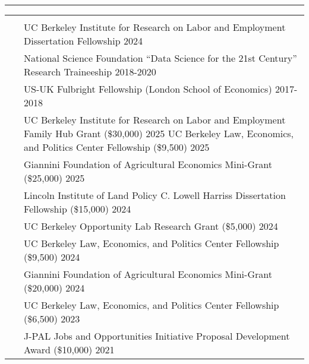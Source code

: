 \documentclass[letterpaper,10pt,oneside]{article}
\newenvironment{myresume}[2]{\pdfbookmark{#1}{#1}{\LARGE{\textbf{#1}}}\vspace{1mm}\hrule\vspace{-2mm}\begin{longtable}{p{0.12\textwidth} p{0.8\textwidth}}&#2}{\end{longtable}}
\renewcommand{\section}[2]{\vspace{-1.5em}\\\pdfbookmark{#1}{#2}{\singlespace\textsc{#1}}&}
\newcommand{\firstentry}[1]{\vspace{0em}\newline#1\vspace{0em}}
\newcommand{\entry}[1]{\vspace{-1em}\\~&#1}
\begin{document}
\begin{myresume}{}
\vspace{1.5em}


\section{Awards}{awards}

\firstentry{UC Berkeley Institute for Research on Labor and Employment Dissertation Fellowship \hfill 2024
}

\entry{National Science Foundation “Data Science for the 21st Century” Research Traineeship
\hfill 2018-2020
}

\entry{US-UK Fulbright Fellowship (London School of Economics) \hfill 2017-2018
}


\section{Research \newline Grants}{grants}

\firstentry{UC Berkeley Institute for Research on Labor and Employment Family Hub Grant (\$30,000) \hspace{1.35cm} 2025 %
\newline UC Berkeley Law, Economics, and Politics Center Fellowship (\$9,500) \hfill 2025
}

\entry{Giannini Foundation of Agricultural Economics Mini-Grant (\$25,000) \hfill 2025
}

\entry{Lincoln Institute of Land Policy C. Lowell Harriss Dissertation Fellowship (\$15,000) \hfill 2024
}

\entry{UC Berkeley Opportunity Lab Research Grant (\$5,000) \hfill 2024
}

\entry{ UC Berkeley Law, Economics, and Politics Center Fellowship (\$9,500) \hfill 2024
}

\entry{Giannini Foundation of Agricultural Economics Mini-Grant (\$20,000) \hfill 2024
}

\entry{UC Berkeley Law, Economics, and Politics Center Fellowship (\$6,500) \hfill 2023
}

\entry{J-PAL Jobs and Opportunities Initiative Proposal Development Award (\$10,000) \hfill 2021
}


\end{myresume}
\end{document}
